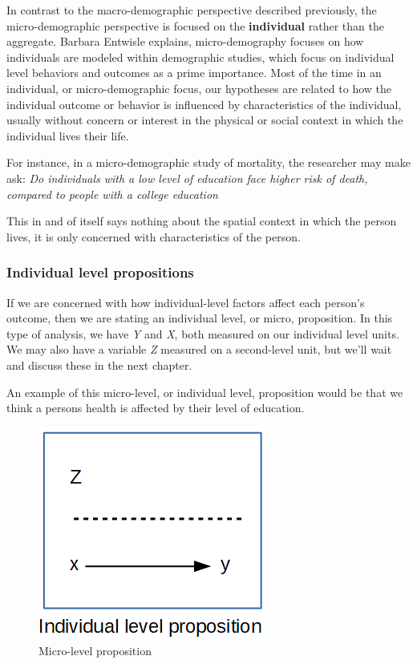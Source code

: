 \documentclass[
]{article}
\begin{document}
In contrast to the macro-demographic perspective described previously, the micro-demographic perspective is focused on the \textbf{individual} rather than the aggregate. Barbara Entwisle \citeyearpar{Entwisle2007a} explains, micro-demography focuses on how individuals are modeled within demographic studies, which focus on individual level behaviors and outcomes as a prime importance. Most of the time in an individual, or micro-demographic focus, our hypotheses are related to how the individual outcome or behavior is influenced by characteristics of the individual, usually without concern or interest in the physical or social context in which the individual lives their life.

For instance, in a micro-demographic study of mortality, the researcher may make ask:
\emph{Do individuals with a low level of education face higher risk of death, compared to people with a college education}

This in and of itself says nothing about the spatial context in which the person lives, it is only concerned with characteristics of the person.

\hypertarget{individual-level-propositions}{%
\subsubsection{Individual level propositions}\label{individual-level-propositions}}

If we are concerned with how individual-level factors affect each person's outcome, then we are stating an individual level, or micro, proposition. In this type of analysis, we have \emph{Y} and \emph{X}, both measured on our individual level units. We may also have a variable \emph{Z} measured on a second-level unit, but we'll wait and discuss these in the next chapter.

An example of this micro-level, or individual level, proposition would be that we think a persons health is affected by their level of education.

\begin{figure}
\centering
\includegraphics{./images/indi.png}
\caption{Micro-level proposition}
\end{figure}
\end{document}
